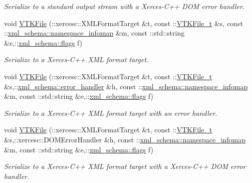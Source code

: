 \begin{DoxyCompactItemize}
\begin{DoxyCompactList}\small\item\em Serialize to a standard output stream with a Xerces-\/\-C++ D\-O\-M error handler. \end{DoxyCompactList}\item 
void \hyperlink{vtk-unstructured_8cpp_aa29105a5170680695be352fa0e00341d}{V\-T\-K\-File} (\-::xercesc\-::\-X\-M\-L\-Format\-Target \&t, const \-::\hyperlink{classVTKFile__t}{V\-T\-K\-File\-\_\-t} \&s, const \-::\hyperlink{namespacexml__schema_ad52b6e3505153cb30ba3452f7868450e}{xml\-\_\-schema\-::namespace\-\_\-infomap} \&m, const \-::std\-::string \&e,\-::\hyperlink{namespacexml__schema_a8d981c127a1f5106d04ad5853e707361}{xml\-\_\-schema\-::flags} f)
\begin{DoxyCompactList}\small\item\em Serialize to a Xerces-\/\-C++ X\-M\-L format target. \end{DoxyCompactList}\item 
void \hyperlink{vtk-unstructured_8cpp_ab09b4a244a093deff01c76e0d066b039}{V\-T\-K\-File} (\-::xercesc\-::\-X\-M\-L\-Format\-Target \&t, const \-::\hyperlink{classVTKFile__t}{V\-T\-K\-File\-\_\-t} \&s,\-::\hyperlink{namespacexml__schema_abdee01986b8e16f04af47dd12038261e}{xml\-\_\-schema\-::error\-\_\-handler} \&h, const \-::\hyperlink{namespacexml__schema_ad52b6e3505153cb30ba3452f7868450e}{xml\-\_\-schema\-::namespace\-\_\-infomap} \&m, const \-::std\-::string \&e,\-::\hyperlink{namespacexml__schema_a8d981c127a1f5106d04ad5853e707361}{xml\-\_\-schema\-::flags} f)
\begin{DoxyCompactList}\small\item\em Serialize to a Xerces-\/\-C++ X\-M\-L format target with an error handler. \end{DoxyCompactList}\item 
void \hyperlink{vtk-unstructured_8cpp_a08394e720690e6ac839c4c06f06fe1c7}{V\-T\-K\-File} (\-::xercesc\-::\-X\-M\-L\-Format\-Target \&t, const \-::\hyperlink{classVTKFile__t}{V\-T\-K\-File\-\_\-t} \&s,\-::xercesc\-::\-D\-O\-M\-Error\-Handler \&h, const \-::\hyperlink{namespacexml__schema_ad52b6e3505153cb30ba3452f7868450e}{xml\-\_\-schema\-::namespace\-\_\-infomap} \&m, const \-::std\-::string \&e,\-::\hyperlink{namespacexml__schema_a8d981c127a1f5106d04ad5853e707361}{xml\-\_\-schema\-::flags} f)
\begin{DoxyCompactList}\small\item\em Serialize to a Xerces-\/\-C++ X\-M\-L format target with a Xerces-\/\-C++ D\-O\-M error handler. \end{DoxyCompactList}\item 

\end{DoxyCompactItemize}
